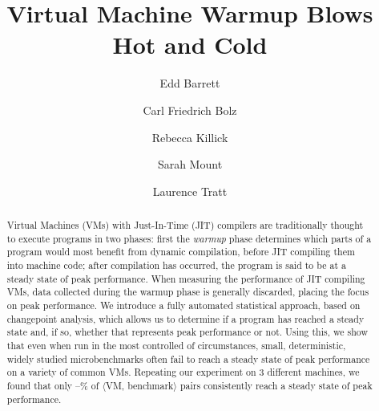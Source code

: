 \documentclass[acmlarge]{acmart}\settopmatter{printfolios=true}
\newcommand{\vmbpair}{$\langle$VM, benchmark$\rangle$\xspace}
\begin{document}
\title{Virtual Machine Warmup Blows Hot and Cold}

\author{Edd Barrett}
\author{Carl Friedrich Bolz}
\author{Rebecca Killick}
\author{Sarah Mount}
\author{Laurence Tratt}

%
%
%

\begin{abstract}
Virtual Machines (VMs) with Just-In-Time (JIT) compilers are traditionally thought
to execute programs in two phases: first the \emph{warmup} phase determines
which parts of a program would most benefit from dynamic compilation, before JIT
compiling them into machine code; after
compilation has occurred, the program is said to be at a steady state of peak performance.
When measuring the performance of JIT compiling VMs, data collected
during the warmup phase is generally discarded, placing the focus on peak
performance. We introduce a fully automated statistical approach, based
on changepoint analysis, which allows us to determine if a program
has reached a steady state and, if so, whether that represents peak
performance or not. Using this, we show that even when run in the
most controlled of circumstances, small, deterministic, widely studied
microbenchmarks often fail to reach a steady state of peak performance on a
variety of common VMs. Repeating our experiment on 3 different machines, we
found that only \mintwo--\maxtwo\% of
\vmbpair pairs consistently reach a steady state of peak performance.
\end{abstract}

\end{document}
